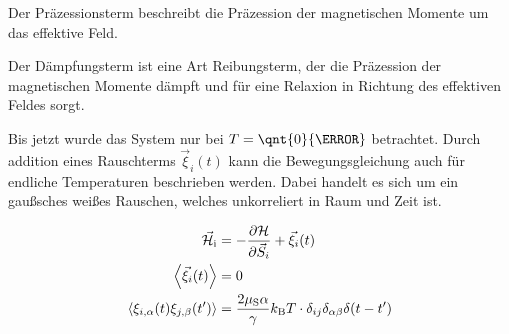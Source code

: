 \documentclass[main.tex]{subfiles}
\begin{document}
Der Präzessionsterm beschreibt die Präzession der magnetischen Momente um das effektive Feld.

Der Dämpfungsterm ist eine Art Reibungsterm, der die Präzession der magnetischen Momente dämpft und für eine Relaxion in Richtung des effektiven Feldes sorgt.

Bis jetzt wurde das System nur bei \(T = \qnt{0}{\kelvin}\) betrachtet.
Durch addition eines Rauschterms \(\vec{\xi}_i(t)\) kann die Bewegungsgleichung auch für endliche Temperaturen beschrieben werden.
Dabei handelt es sich um ein gaußsches weißes Rauschen, welches unkorreliert in Raum und Zeit ist.

\begin{align}
	\vec{\mathcal{H}}_{\text{i}} 
	& = -\pdv{\mathcal{H}}{\vec{S}_i} + \vec{\xi}_i(t) \\
	\expval{\vec{\xi}_i(t)} & = 0 \\
	\expval{\xi_{i,\alpha}(t) \xi_{j,\beta}(t')} 
	& = \frac{2\mu_\text{S} \alpha}{\gamma}k_\text{B} T \cdot \delta_{ij} \delta_{\alpha \beta}	\delta(t-t')
\end{align}
\end{document}
